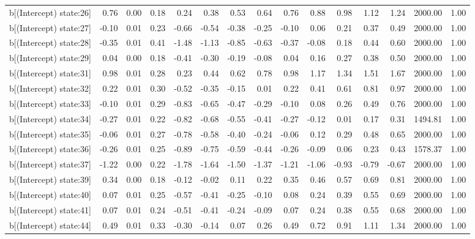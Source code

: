 \begin{table}[ht]
\begin{tabular}{rrrrrrrrrrrrrrr}
  b[(Intercept) state:26] & 0.76 & 0.00 & 0.18 & 0.24 & 0.38 & 0.53 & 0.64 & 0.76 & 0.88 & 0.98 & 1.12 & 1.24 & 2000.00 & 1.00 \\ 
  b[(Intercept) state:27] & -0.10 & 0.01 & 0.23 & -0.66 & -0.54 & -0.38 & -0.25 & -0.10 & 0.06 & 0.21 & 0.37 & 0.49 & 2000.00 & 1.00 \\ 
  b[(Intercept) state:28] & -0.35 & 0.01 & 0.41 & -1.48 & -1.13 & -0.85 & -0.63 & -0.37 & -0.08 & 0.18 & 0.44 & 0.60 & 2000.00 & 1.00 \\ 
  b[(Intercept) state:29] & 0.04 & 0.00 & 0.18 & -0.41 & -0.30 & -0.19 & -0.08 & 0.04 & 0.16 & 0.27 & 0.38 & 0.50 & 2000.00 & 1.00 \\ 
  b[(Intercept) state:31] & 0.98 & 0.01 & 0.28 & 0.23 & 0.44 & 0.62 & 0.78 & 0.98 & 1.17 & 1.34 & 1.51 & 1.67 & 2000.00 & 1.00 \\ 
  b[(Intercept) state:32] & 0.22 & 0.01 & 0.30 & -0.52 & -0.35 & -0.15 & 0.01 & 0.22 & 0.41 & 0.61 & 0.81 & 0.97 & 2000.00 & 1.00 \\ 
  b[(Intercept) state:33] & -0.10 & 0.01 & 0.29 & -0.83 & -0.65 & -0.47 & -0.29 & -0.10 & 0.08 & 0.26 & 0.49 & 0.76 & 2000.00 & 1.00 \\ 
  b[(Intercept) state:34] & -0.27 & 0.01 & 0.22 & -0.82 & -0.68 & -0.55 & -0.41 & -0.27 & -0.12 & 0.01 & 0.17 & 0.31 & 1494.81 & 1.00 \\ 
  b[(Intercept) state:35] & -0.06 & 0.01 & 0.27 & -0.78 & -0.58 & -0.40 & -0.24 & -0.06 & 0.12 & 0.29 & 0.48 & 0.65 & 2000.00 & 1.00 \\ 
  b[(Intercept) state:36] & -0.26 & 0.01 & 0.25 & -0.89 & -0.75 & -0.59 & -0.44 & -0.26 & -0.09 & 0.06 & 0.23 & 0.43 & 1578.37 & 1.00 \\ 
  b[(Intercept) state:37] & -1.22 & 0.00 & 0.22 & -1.78 & -1.64 & -1.50 & -1.37 & -1.21 & -1.06 & -0.93 & -0.79 & -0.67 & 2000.00 & 1.00 \\ 
  b[(Intercept) state:39] & 0.34 & 0.00 & 0.18 & -0.12 & -0.02 & 0.11 & 0.22 & 0.35 & 0.46 & 0.57 & 0.69 & 0.81 & 2000.00 & 1.00 \\ 
  b[(Intercept) state:40] & 0.07 & 0.01 & 0.25 & -0.57 & -0.41 & -0.25 & -0.10 & 0.08 & 0.24 & 0.39 & 0.55 & 0.69 & 2000.00 & 1.00 \\ 
  b[(Intercept) state:41] & 0.07 & 0.01 & 0.24 & -0.51 & -0.41 & -0.24 & -0.09 & 0.07 & 0.24 & 0.38 & 0.55 & 0.68 & 2000.00 & 1.00 \\ 
  b[(Intercept) state:44] & 0.49 & 0.01 & 0.33 & -0.30 & -0.14 & 0.07 & 0.26 & 0.49 & 0.72 & 0.91 & 1.11 & 1.34 & 2000.00 & 1.00 \\ 

\end{tabular}
\end{table}
